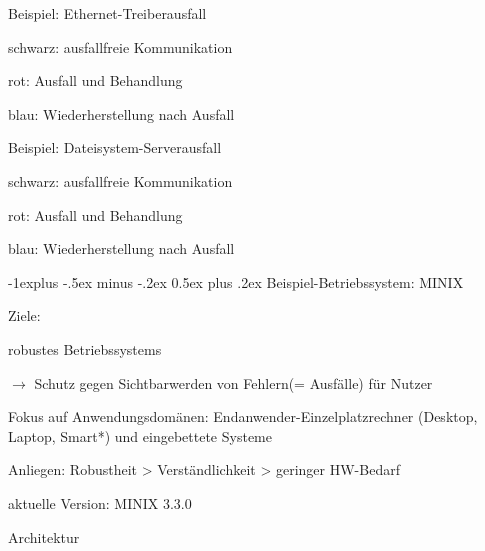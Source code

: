 \documentclass[a4paper]{article}
\makeatletter
\renewcommand{\subsection}{\@startsection{subsection}{2}{0mm}%
 {-1explus -.5ex minus -.2ex}%
 {0.5ex plus .2ex}%
 {\normalfont\normalsize\bfseries}}
\makeatother
\begin{document}
\begin{multicols}{3}
    Beispiel: Ethernet-Treiberausfall

    \begin{itemize*}
        \item
        schwarz: ausfallfreie Kommunikation
        \item
        rot: Ausfall und Behandlung
        \item
        blau: Wiederherstellung nach Ausfall
    \end{itemize*}

    Beispiel: Dateisystem-Serverausfall

    \begin{itemize*}
        \item
        schwarz: ausfallfreie Kommunikation
        \item
        rot: Ausfall und Behandlung
        \item
        blau: Wiederherstellung nach Ausfall
    \end{itemize*}


    \subsection{Beispiel-Betriebssystem:
        MINIX}

    \begin{itemize*}
        \item
        Ziele:
        \item
        robustes Betriebssystems
        \item
        $\rightarrow$ Schutz gegen Sichtbarwerden von
        Fehlern(= Ausfälle) für Nutzer
        \item
        Fokus auf Anwendungsdomänen: Endanwender-Einzelplatzrechner (Desktop,
        Laptop, Smart*) und eingebettete Systeme
        \item
        Anliegen: Robustheit \textgreater{} Verständlichkeit \textgreater{}
        geringer HW-Bedarf
        \item
        aktuelle Version: MINIX 3.3.0
    \end{itemize*}

    Architektur


\end{multicols}
\end{document}
